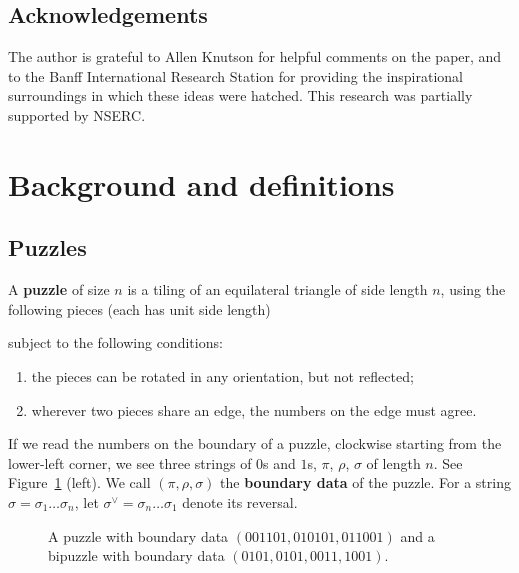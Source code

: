 \documentclass[12pt]{article}
\begin{document}
\subsection{Acknowledgements}
The author is grateful to Allen Knutson for helpful comments on the
paper, and to the Banff International Research Station for providing
the inspirational surroundings in which these ideas were hatched.  
This research was partially supported by NSERC.

\section{Background and definitions}
\label{sec:background}
\subsection{Puzzles}
\label{sec:puzzles}
A {\bf puzzle} of size $n$ is a tiling of an equilateral triangle of 
side length $n$, using the following pieces (each has unit side length)
\begin{center}
\end{center}
subject to the following conditions:
\begin{enumerate}
\item[(i)]
the pieces can be rotated in any orientation, but not reflected;
\item[(ii)]
wherever two pieces share an edge, the numbers on the edge must
agree.
\end{enumerate}

If we read the numbers on the boundary of a puzzle, clockwise starting
from the lower-left corner, we see three strings of $0$s and $1$s,
$\pi$, $\rho$, $\sigma$ of length $n$. See Figure~\ref{fig:puzzle} (left). 
We call $(\pi, \rho, \sigma)$ the {\bf boundary data} of the puzzle.  
For a string $\sigma=\sigma_1\ldots\sigma_n$, let
$\sigma^\vee = \sigma_n \ldots \sigma_1$ denote its reversal.

\begin{figure}[htbp]
  \begin{center}
    \caption{A puzzle with boundary data $(001101, 010101, 011001)$
and a bipuzzle with boundary data $(0101, 0101, 0011, 1001)$.}
    \label{fig:puzzle}
  \end{center}
\end{figure}
\end{document}
